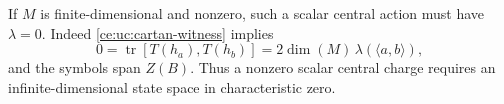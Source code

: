 If $M$ is finite-dimensional and nonzero, such a scalar central action
must have $\lambda=0$.  Indeed \eqref{ce:uc:cartan-witness} implies
\[
 0=\operatorname{tr}[T(h_a),T(h_b)]
   =2\dim(M)\,\lambda(\langle a,b\rangle),
\]
and the symbols span $Z(B)$.  Thus a nonzero scalar central charge
requires an infinite-dimensional state space in characteristic zero.
